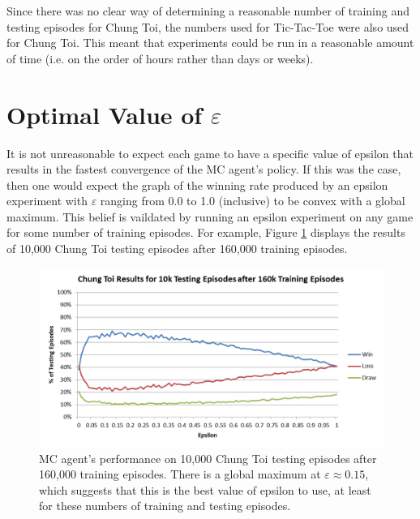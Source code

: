 \documentclass[11pt,a4paper]{report}
\begin{document}
Since there was no clear way of determining a reasonable number of training and testing episodes for Chung Toi, the numbers used for Tic-Tac-Toe were also used for Chung Toi. This meant that experiments could be run in a reasonable amount of time (i.e. on the order of hours rather than days or weeks).


\section{Optimal Value of $\varepsilon$}
\label{sec:optimal_epsilon}

It is not unreasonable to expect each game to have a specific value of epsilon that results in the fastest convergence of the MC agent's policy. If this was the case, then one would expect the graph of the winning rate produced by an epsilon experiment with $\varepsilon$ ranging from 0.0 to 1.0 (inclusive) to be convex with a global maximum. This belief is vaildated by running an epsilon experiment on any game for some number of training episodes. For example, Figure \ref{chung-toi-epsilon-160ktrain-10ktest} displays the results of 10,000 Chung Toi testing episodes after 160,000 training episodes.

\begin{figure}[htbp]
	\begin{center}
		\includegraphics[width=\linewidth]{ChungToi_EpsilonResults_160kTrainingGames_10kTestingGames.png}
		\caption{MC agent's performance on 10,000 Chung Toi testing episodes after 160,000 training episodes. There is a global maximum at $\varepsilon \approx 0.15$, which suggests that this is the best value of epsilon to use, at least for these numbers of training and testing episodes.}
		\label{chung-toi-epsilon-160ktrain-10ktest}
	\end{center}
\end{figure}
\end{document}

